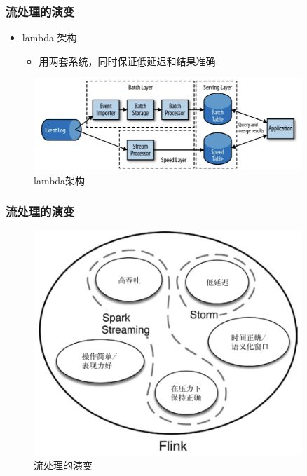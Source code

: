 \documentclass{beamer}
\begin{document}
  \begin{frame}
    \frametitle{流处理的演变}
  
    \begin{itemize}
      \item lambda 架构
        \begin{itemize}
          \item 用两套系统，同时保证低延迟和结果准确
        \end{itemize}
    \end{itemize}

    \begin{figure}
      \centering
      \includegraphics[width=0.9\textwidth]{image7.png}
      \caption{lambda架构}
    \end{figure}
  
  \end{frame}

  \begin{frame}
    \frametitle{流处理的演变}
  
    \begin{figure}
      \centering
      \includegraphics[width=0.9\textwidth]{image8.png}
      \caption{流处理的演变}
    \end{figure}
  
  \end{frame}
\end{document}
